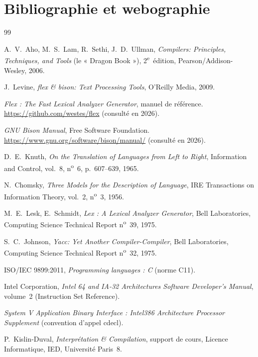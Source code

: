 \chapter*{Bibliographie et webographie}

\begin{thebibliography}{99}

A.~V.~Aho, M.~S.~Lam, R.~Sethi, J.~D.~Ullman,
\emph{Compilers: Principles, Techniques, and Tools} (le « Dragon Book »),
2\textsuperscript{e}~édition, Pearson/Addison-Wesley, 2006.

J.~Levine,
\emph{flex \& bison: Text Processing Tools},
O'Reilly Media, 2009.

\emph{Flex : The Fast Lexical Analyzer Generator}, manuel de référence.
\url{https://github.com/westes/flex} (consulté en 2026).

\emph{GNU Bison Manual}, Free Software Foundation.
\url{https://www.gnu.org/software/bison/manual/} (consulté en 2026).

D.~E.~Knuth,
\emph{On the Translation of Languages from Left to Right},
Information and Control, vol.~8, n\textsuperscript{o}~6, p.~607--639, 1965.

N.~Chomsky,
\emph{Three Models for the Description of Language},
IRE Transactions on Information Theory, vol.~2, n\textsuperscript{o}~3, 1956.

M.~E.~Lesk, E.~Schmidt,
\emph{Lex : A Lexical Analyzer Generator},
Bell Laboratories, Computing Science Technical Report n\textsuperscript{o}~39, 1975.

S.~C.~Johnson,
\emph{Yacc: Yet Another Compiler-Compiler},
Bell Laboratories, Computing Science Technical Report n\textsuperscript{o}~32, 1975.

ISO/IEC 9899:2011, \emph{Programming languages : C} (norme C11).

Intel Corporation,
\emph{Intel 64 and IA-32 Architectures Software Developer's Manual},
volume~2 (Instruction Set Reference).

\emph{System V Application Binary Interface : Intel386 Architecture Processor
Supplement} (convention d'appel cdecl).

P.~Kislin-Duval,
\emph{Interprétation \& Compilation}, support de cours, Licence Informatique,
IED, Université Paris~8.

\end{thebibliography}
